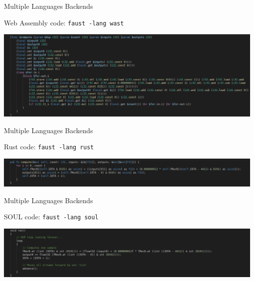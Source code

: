 \begin{frame}[fragile]{Multiple Languages Backends}
    \begin{block}{Web Assembly code: \lstinline'faust -lang wast'}
        \begin{center}
            \includegraphics[width=\textwidth,keepaspectratio=true]{images/echo-wat.png}
        \end{center}
    \end{block}
\end{frame}


\begin{frame}[fragile]{Multiple Languages Backends}
    \begin{block}{Rust code: \lstinline'faust -lang rust'}
        \begin{center}
            \includegraphics[width=\textwidth,keepaspectratio=true]{images/echo-rust.png}
        \end{center}
    \end{block}
\end{frame}


\begin{frame}[fragile]{Multiple Languages Backends}
    \begin{block}{SOUL code: \lstinline'faust -lang soul'}
        \begin{center}
            \includegraphics[width=\textwidth,keepaspectratio=true]{images/echo-soul.png}
        \end{center}
    \end{block}
\end{frame}
